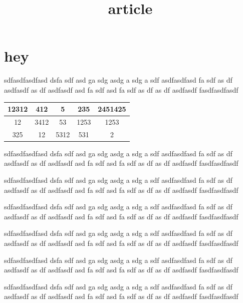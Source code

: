 \documentclass[12pt,a4paper]{article}
\begin{document}
\title{article}
\author{}
\date{}
\maketitle


\section{hey}

\begin{multicols}{3}
sdfasdfasdfasd dsfa sdf asd ga sdg asdg a sdg a sdf asdfasdfasd fa sdf as df asdfasdf as df asdfasdf asd fa sdf asd fa sdf as df as df asdfasdf
fasdfasdfasdf

 \begin{table}[H]
\begin{center}
\begin{tabular}{|c|c|c|c|c|}
\hline
12312 & 412 & 5 & 235 & 2451425 \\ \hline 
12 & 3412 & 53 & 1253 & 1253 \\ \hline 
325 & 12 & 5312 & 531 & 2
\\ \hline
\end{tabular}
\end{center}
\end{table} 

sdfasdfasdfasd dsfa sdf asd ga sdg asdg a sdg a sdf asdfasdfasd fa sdf as df asdfasdf as df asdfasdf asd fa sdf asd fa sdf as df as df asdfasdf
fasdfasdfasdf

sdfasdfasdfasd dsfa sdf asd ga sdg asdg a sdg a sdf asdfasdfasd fa sdf as df asdfasdf as df asdfasdf asd fa sdf asd fa sdf as df as df asdfasdf
fasdfasdfasdf

sdfasdfasdfasd dsfa sdf asd ga sdg asdg a sdg a sdf asdfasdfasd fa sdf as df asdfasdf as df asdfasdf asd fa sdf asd fa sdf as df as df asdfasdf
fasdfasdfasdf

sdfasdfasdfasd dsfa sdf asd ga sdg asdg a sdg a sdf asdfasdfasd fa sdf as df asdfasdf as df asdfasdf asd fa sdf asd fa sdf as df as df asdfasdf
fasdfasdfasdf

sdfasdfasdfasd dsfa sdf asd ga sdg asdg a sdg a sdf asdfasdfasd fa sdf as df asdfasdf as df asdfasdf asd fa sdf asd fa sdf as df as df asdfasdf
fasdfasdfasdf

sdfasdfasdfasd dsfa sdf asd ga sdg asdg a sdg a sdf asdfasdfasd fa sdf as df asdfasdf as df asdfasdf asd fa sdf asd fa sdf as df as df asdfasdf
fasdfasdfasdf


\end{multicols}
\end{document}
